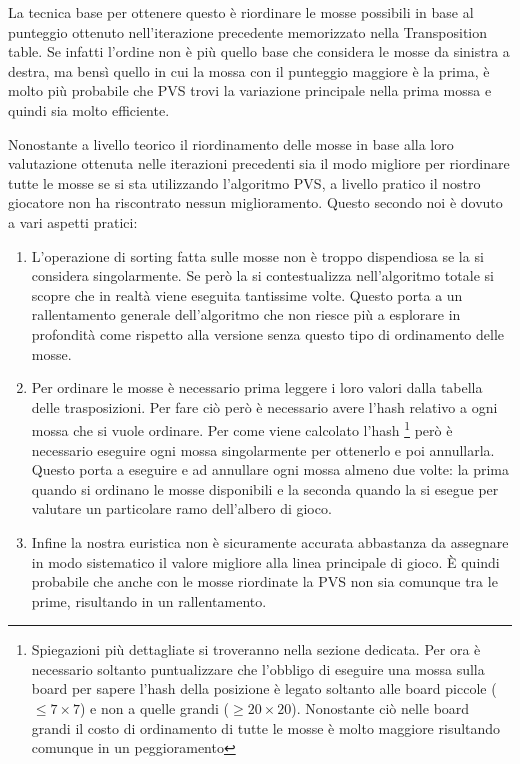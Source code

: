 \documentclass[a4paper]{article}
\begin{document}
La tecnica base per ottenere questo è riordinare le mosse possibili in base 
al punteggio ottenuto nell'iterazione precedente memorizzato nella Transposition
table. Se infatti l'ordine non è più quello base che considera le mosse da 
sinistra a destra, ma bensì quello in cui la mossa con il punteggio maggiore è
la prima, è molto più probabile che PVS trovi la variazione principale nella 
prima mossa e quindi sia molto efficiente.

Nonostante a livello teorico il riordinamento delle mosse in base alla loro 
valutazione ottenuta nelle iterazioni precedenti sia il modo migliore per 
riordinare tutte le mosse se si sta utilizzando l'algoritmo PVS, a livello 
pratico il nostro giocatore non ha riscontrato nessun miglioramento. Questo 
secondo noi è dovuto a vari aspetti pratici:
\begin{enumerate}
  \item L'operazione di sorting fatta sulle mosse non è troppo dispendiosa 
    se la si considera singolarmente. Se però la si contestualizza 
    nell'algoritmo totale si scopre che in realtà viene eseguita tantissime 
    volte. Questo porta a un rallentamento generale dell'algoritmo che non 
    riesce più a esplorare in profondità come rispetto alla versione senza 
    questo tipo di ordinamento delle mosse.

  \item Per ordinare le mosse è necessario prima leggere i loro valori dalla 
    tabella delle trasposizioni. Per fare ciò però è necessario avere l'hash 
    relativo a ogni mossa che si vuole ordinare. Per come viene calcolato 
    l'hash \footnote{Spiegazioni più dettagliate si troveranno nella sezione
    dedicata. Per ora è necessario soltanto puntualizzare che l'obbligo di 
    eseguire una mossa sulla board per sapere l'hash della posizione è legato
    soltanto alle board piccole ($\leq 7 \times 7$) e non a quelle grandi 
    ($\geq 20 \times 20$). Nonostante ciò nelle board grandi il costo di 
    ordinamento di tutte le mosse è molto maggiore risultando comunque in un
    peggioramento} però è necessario eseguire ogni mossa singolarmente per 
    ottenerlo e poi annullarla. Questo porta a eseguire e ad annullare ogni 
    mossa almeno due volte: la prima quando si ordinano le mosse disponibili e 
    la seconda quando la si esegue per valutare un particolare ramo dell'albero
    di gioco. 

  \item Infine la nostra euristica non è sicuramente accurata abbastanza da 
    assegnare in modo sistematico il valore migliore alla linea principale di 
    gioco. È quindi probabile che anche con le mosse riordinate la PVS non sia
    comunque tra le prime, risultando in un rallentamento.
\end{enumerate}
\end{document}
